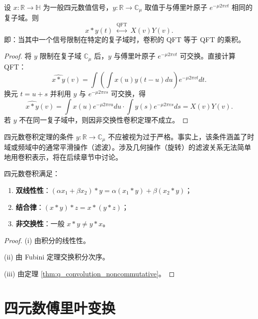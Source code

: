 \begin{theorem}[四元数卷积定理]\label{thm:q_convolution_theorem}
设 $x:\mathbb{R}\to\mathbb{H}$ 为一般四元数值信号，$y:\mathbb{R}\to\mathbb{C}_\mu$ 取值于与傅里叶原子 $e^{-\mu 2\pi vt}$ 相同的复子域。则
\[
x*y(t)\ \overset{\text{QFT}}{\longleftrightarrow}\ X(v)Y(v).
\]
即：当其中一个信号限制在特定的复子域时，卷积的 QFT 等于 QFT 的乘积。
\end{theorem}

\begin{proof}
将 $y$ 限制在复子域 $\mathbb{C}_\mu$ 后，$y$ 与傅里叶原子 $e^{-\mu 2\pi vt}$ 可交换。直接计算 QFT：
\[
\widehat{x*y}(v)=\int\left(\int x(u)y(t-u)du\right)e^{-\mu 2\pi vt}dt.
\]
换元 $t=u+s$ 并利用 $y$ 与 $e^{-\mu 2\pi vs}$ 可交换，得
\[
\widehat{x*y}(v)=\int x(u)e^{-\mu 2\pi vu}du\cdot\int y(s)e^{-\mu 2\pi vs}ds=X(v)Y(v).
\]
若 $y$ 不在同一复子域中，则因非交换性卷积定理不成立。
\end{proof}

\begin{remark}[卷积定理的限制条件]\label{rem:q_convolution_restriction}
四元数卷积定理的条件 $y:\mathbb{R}\to\mathbb{C}_\mu$ 不应被视为过于严格。事实上，该条件涵盖了时域或频域中的通常平滑操作（滤波）。涉及几何操作（旋转）的滤波关系无法简单地用卷积表示，将在后续章节中讨论。
\end{remark}

\begin{proposition}[四元数卷积的基本性质]\label{prop:q_convolution_properties}
四元数卷积满足：
\begin{enumerate}[label=(\roman*)]
    \item \textbf{双线性性}：$(\alpha x_1+\beta x_2)*y=\alpha(x_1*y)+\beta(x_2*y)$；
    \item \textbf{结合律}：$(x*y)*z=x*(y*z)$；
    \item \textbf{非交换性}：一般 $x*y\neq y*x$。
\end{enumerate}
\end{proposition}

\begin{proof}
(i) 由积分的线性性。

(ii) 由 Fubini 定理交换积分次序。

(iii) 由定理 \ref{thm:q_convolution_noncommutative}。
\end{proof}

\section{四元数傅里叶变换}

